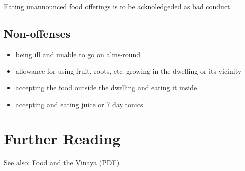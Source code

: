 Eating unannounced food offerings is to be acknoledgeded as bad conduct.

\subsection{Non-offenses}

\begin{itemize}
\tightlist
\item
  being ill and unable to go on alms-round
\item
  allowance for using fruit, roots, etc. growing in the dwelling or its
  vicinity
\item
  accepting the food outside the dwelling and eating it inside
\item
  accepting and eating juice or 7 day tonics
\end{itemize}

\section{Further Reading}

See also:
\href{https://vinaya-class.github.io/includes/docs/food-and-the-vinaya.pdf}{Food
and the Vinaya (PDF)}

